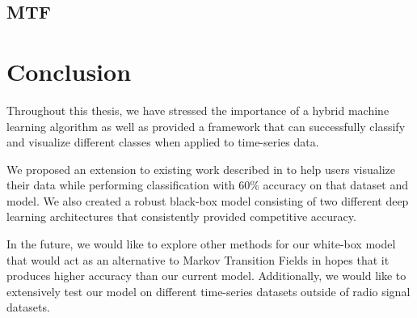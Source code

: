 \documentclass{turabian-thesis}
\begin{document}

\section{ MTF }

\chapter{Conclusion}
\label{chap:conclusion}
Throughout this thesis, we have stressed the importance of a hybrid machine learning algorithm as well as provided a framework that can successfully classify and visualize different classes when applied to time-series data. 

We proposed an extension to existing work described in \cite{wang_encoding_nodate} to help users visualize their data while performing classification  with 60\% accuracy on that dataset and model. We also created a robust black-box model consisting of two different deep learning architectures that consistently provided competitive accuracy.

In the future, we would like to explore other methods for our white-box model that would act as an alternative to Markov Transition Fields in hopes that it produces higher accuracy than our current model. Additionally, we would like to extensively test our model on different time-series datasets outside of radio signal datasets.



 
\end{document}
